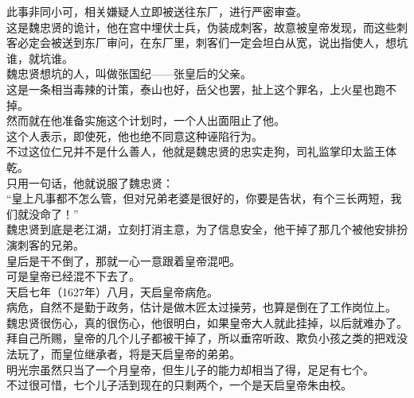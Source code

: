 \begin{multicols}{\theparacolNo}
此事非同小可，相关嫌疑人立即被送往东厂，进行严密审查。\\

这是魏忠贤的诡计，他在宫中埋伏士兵，伪装成刺客，故意被皇帝发现，而这些刺客必定会被送到东厂审问，在东厂里，刺客们一定会坦白从宽，说出指使人，想坑谁，就坑谁。\\

魏忠贤想坑的人，叫做张国纪——张皇后的父亲。\\

这是一条相当毒辣的计策，泰山也好，岳父也罢，扯上这个罪名，上火星也跑不掉。\\

然而就在他准备实施这个计划时，一个人出面阻止了他。\\

这个人表示，即使死，他也绝不同意这种诬陷行为。\\

不过这位仁兄并不是什么善人，他就是魏忠贤的忠实走狗，司礼监掌印太监王体乾。\\

只用一句话，他就说服了魏忠贤：\\

“皇上凡事都不怎么管，但对兄弟老婆是很好的，你要是告状，有个三长两短，我们就没命了！”\\

魏忠贤到底是老江湖，立刻打消主意，为了信息安全，他干掉了那几个被他安排扮演刺客的兄弟。\\

皇后是干不倒了，那就一心一意跟着皇帝混吧。\\

可是皇帝已经混不下去了。\\

天启七年（1627年）八月，天启皇帝病危。\\

病危，自然不是勤于政务，估计是做木匠太过操劳，也算是倒在了工作岗位上。\\

魏忠贤很伤心，真的很伤心，他很明白，如果皇帝大人就此挂掉，以后就难办了。\\

拜自己所赐，皇帝的几个儿子都被干掉了，所以垂帘听政、欺负小孩之类的把戏没法玩了，而皇位继承者，将是天启皇帝的弟弟。\\

明光宗虽然只当了一个月皇帝，但生儿子的能力却相当了得，足足有七个。\\

不过很可惜，七个儿子活到现在的只剩两个，一个是天启皇帝朱由校。\\


\end{multicols}
